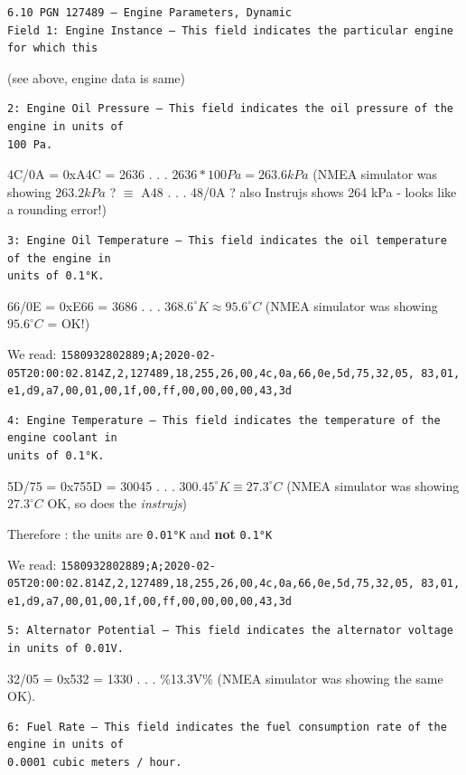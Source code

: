 \documentclass[11pt]{article}
\begin{document}
\begin{verbatim}
6.10 PGN 127489 – Engine Parameters, Dynamic
Field 1: Engine Instance – This field indicates the particular engine for which this
\end{verbatim}

(see above, engine data is same)

\begin{verbatim}
2: Engine Oil Pressure – This field indicates the oil pressure of the engine in units of
100 Pa.
\end{verbatim}

4C/0A = 0xA4C = 2636 . . . \(2636 * 100Pa = 263.6kPa\) (NMEA simulator
was showing \(263.2kPa\) ? \(\equiv\) A48 . . . 48/0A ? also Instrujs
shows 264 kPa - looks like a rounding error!)

    \begin{verbatim}
3: Engine Oil Temperature – This field indicates the oil temperature of the engine in
units of 0.1°K.
\end{verbatim}

66/0E = 0xE66 = 3686 . . . \(368.6^{\circ}K \approx 95.6^{\circ}C\)
(NMEA simulator was showing \(95.6^{\circ}C\) = OK!)

    We read:
\texttt{1580932802889;A;2020-02-05T20:00:02.814Z,2,127489,18,255,26,00,4c,0a,66,0e,5d,75,32,05,\ 83,01,e1,d9,a7,00,01,00,1f,00,ff,00,00,00,00,43,3d}

\begin{verbatim}
4: Engine Temperature – This field indicates the temperature of the engine coolant in
units of 0.1°K.
\end{verbatim}

5D/75 = 0x755D = 30045 . . . \(300.45^{\circ}K \equiv 27.3^{\circ}C\)
(NMEA simulator was showing \(27.3^{\circ}C\) OK, so does the
\emph{instrujs})

Therefore : the units are \texttt{0.01°K} and \textbf{not}
\texttt{0.1°K}

    We read:
\texttt{1580932802889;A;2020-02-05T20:00:02.814Z,2,127489,18,255,26,00,4c,0a,66,0e,5d,75,32,05,\ 83,01,e1,d9,a7,00,01,00,1f,00,ff,00,00,00,00,43,3d}

\begin{verbatim}
5: Alternator Potential – This field indicates the alternator voltage in units of 0.01V. 
\end{verbatim}

32/05 = 0x532 = 1330 . . . \%13.3V\% (NMEA simulator was showing the
same OK).

    \begin{verbatim}
6: Fuel Rate – This field indicates the fuel consumption rate of the engine in units of
0.0001 cubic meters / hour.
\end{verbatim}
\end{document}
